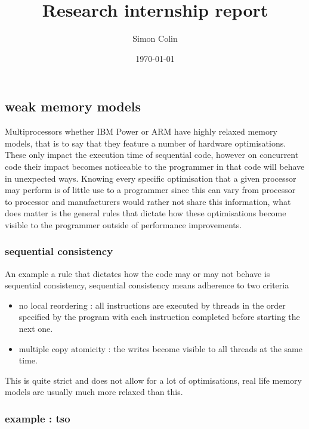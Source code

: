 \documentclass[a4,12pt]{article}
\title{Research internship report}
\author{Simon Colin}
\date{\today}
\begin{document}
\maketitle


\subsection{weak memory models}

Multiprocessors whether IBM Power or ARM have highly relaxed memory models, that is to say that they feature a number of hardware optimisations. These only impact the execution time of sequential code, however on concurrent code their impact becomes noticeable to the programmer in that code will behave in unexpected ways. Knowing every specific optimisation that a given processor may perform is of little use to a programmer since this can vary from processor to processor and manufacturers would rather not share this information, what does matter is the general rules that dictate how these optimisations become visible to the programmer outside of performance improvements.

\subsubsection{sequential consistency}

An example a rule that dictates how the code may or may not behave is sequential consistency, sequential consistency means adherence to two criteria 
\begin{itemize}
\item no local reordering : all instructions are executed by threads in the order specified by the program with each instruction completed before starting the next one.
\item multiple copy atomicity : the writes become visible to all threads at the same time.
\end{itemize}
This is quite strict and does not allow for a lot of optimisations, real life memory models are usually much more relaxed than this.

\subsubsection{example : tso}
\end{document}
